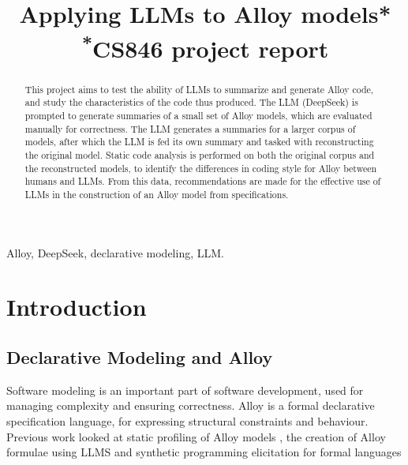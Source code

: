 \documentclass[conference]{IEEEtran}
\begin{document}
\title{Applying LLMs to Alloy models*\\
{\footnotesize \textsuperscript{*}CS846 project report}
}

\author{


}

\maketitle

\begin{abstract}
This project aims to test the ability of LLMs to summarize and generate Alloy code, and study the characteristics of the code thus produced. The LLM (DeepSeek) is prompted to generate summaries of a small set of Alloy models, which are evaluated manually for correctness. The LLM generates a summaries for a larger corpus of models, after which the LLM is fed its own summary and tasked with reconstructing the original model. Static code analysis is performed on both the original corpus and the reconstructed models, to identify the differences in coding style for Alloy between humans and LLMs. From this data, recommendations are made for the effective use of LLMs in the construction of an Alloy model from specifications.
\end{abstract}


\begin{IEEEkeywords}
Alloy, DeepSeek, declarative modeling, LLM.
\end{IEEEkeywords}


\section{Introduction}


\subsection{Declarative Modeling and Alloy}

Software modeling is an important part of software development, used for managing complexity and ensuring correctness.
Alloy \cite{jackson-reference} is a formal declarative specification language, for expressing structural constraints and behaviour. Previous work looked at static profiling of Alloy models \cite{eid}, the creation of Alloy formulae using LLMS \cite{unnamed} and synthetic programming elicitation for formal languages \cite{mora}
\end{document}
